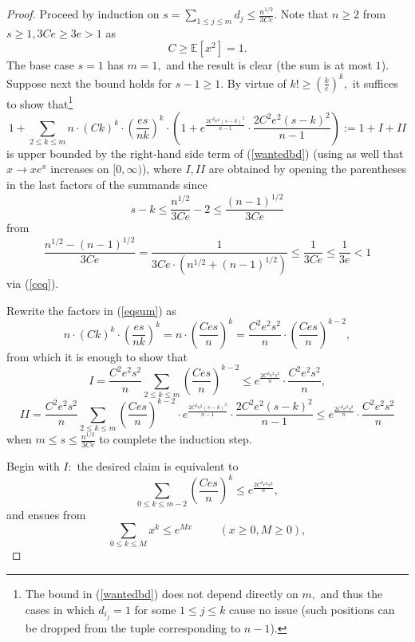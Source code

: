 \documentclass{article}
\numberwithin{equation}{section}
\begin{document}
\begin{proof}
    Proceed by induction on \(s=\sum_{1 \leq j \leq m}{d_j} \leq \frac{n^{1/2}}{3Ce}.\) Note that \(n \geq 2\) from \(s \geq 1,3Ce \geq 3e>1\) as
    \begin{equation}\label{ceq}
        C \geq \mathbb{E}[x^2]=1.
    \end{equation}
    The base case \(s=1\) has \(m=1,\) and the result is clear (the sum is at most \(1\)). Suppose next the bound holds for \(s-1 \geq 1.\) By virtue of \(k! \geq (\frac{k}{e})^k,\) it suffices to show that\footnote{The bound in (\ref{wantedbd}) does  not depend directly on \(m,\) and thus the cases in which \(d_{i_j}=1\) for some \(1 \leq j \leq k\) cause no issue (such positions can be dropped from the tuple corresponding to \(n-1\)).}
    \begin{equation}\label{eqsum}
        1+\sum_{2 \leq k \leq m}{n \cdot (Ck)^{k} \cdot (\frac{es}{nk})^k \cdot (1+e^{\frac{2C^2e^2(s-k)^2}{n-1}} \cdot \frac{2C^2e^2(s-k)^2}{n-1})}:=1+I+II
    \end{equation}
    is upper bounded by the right-hand side term of (\ref{wantedbd}) (using as well that \(x \to xe^{x}\) increases on \([0,\infty)\)), where \(I,II\) are obtained by opening the parentheses in the last factors of the summands since 
     \[s-k \leq \frac{n^{1/2}}{3Ce}-2 \leq \frac{(n-1)^{1/2}}{3Ce}\] 
     from 
     \[\frac{n^{1/2}-(n-1)^{1/2}}{3Ce}=\frac{1}{3Ce \cdot (n^{1/2}+(n-1)^{1/2})} \leq \frac{1}{3Ce} \leq \frac{1}{3e}<1\]
     via (\ref{ceq}). 
     \par
     Rewrite the factors in (\ref{eqsum}) as
    \[n \cdot (Ck)^{k} \cdot (\frac{es}{nk})^k=n \cdot (\frac{Ces}{n})^{k}=\frac{C^2e^2s^2}{n} \cdot (\frac{Ces}{n})^{k-2},\]
    from which it is enough to show that
    \[I=\frac{C^2e^2s^2}{n} \sum_{2 \leq k \leq m}{(\frac{Ces}{n})^{k-2}} \leq e^{\frac{2C^2e^2s^2}{n}} \cdot \frac{C^2e^2s^2}{n},\]
    \[II=\frac{C^2e^2s^2}{n} \sum_{2 \leq k \leq m}{(\frac{Ces}{n})^{k-2} \cdot e^{\frac{2C^2e^2(s-k)^2}{n-1}} \cdot \frac{2C^2e^2(s-k)^2}{n-1}} \leq e^{\frac{2C^2e^2s^2}{n}} \cdot \frac{C^2e^2s^2}{n}\]
    when \(m \leq s \leq \frac{n^{1/2}}{3Ce}\) to complete the induction step. %
    \par
    Begin with \(I:\) the desired claim is equivalent to
    \[\sum_{0 \leq k \leq m-2}{(\frac{Ces}{n})^{k}} \leq e^{\frac{2C^2e^2s^2}{n}},\]
    and ensues from
    \begin{equation}\label{helper}
        \sum_{0 \leq k \leq M}{x^k} \leq e^{Mx} \hspace{1cm} (x \geq 0,M \geq 0),

\end{equation}
\end{proof}
\end{document}
